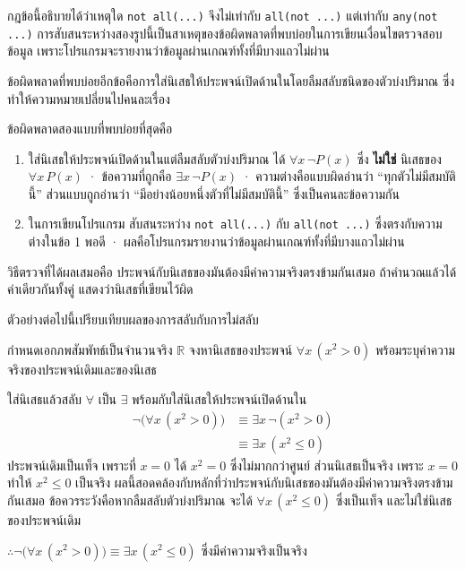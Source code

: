 กฎข้อนี้อธิบายได้ว่าเหตุใด \texttt{not all(...)} จึงไม่เท่ากับ \texttt{all(not ...)} แต่เท่ากับ \texttt{any(not ...)} การสับสนระหว่างสองรูปนี้เป็นสาเหตุของข้อผิดพลาดที่พบบ่อยในการเขียนเงื่อนไขตรวจสอบข้อมูล เพราะโปรแกรมจะรายงานว่าข้อมูลผ่านเกณฑ์ทั้งที่มีบางแถวไม่ผ่าน

ข้อผิดพลาดที่พบบ่อยอีกข้อคือการใส่นิเสธให้ประพจน์เปิดด้านในโดยลืมสลับชนิดของตัวบ่งปริมาณ ซึ่งทำให้ความหมายเปลี่ยนไปคนละเรื่อง

\begin{warning}
ข้อผิดพลาดสองแบบที่พบบ่อยที่สุดคือ

\begin{enumerate}
    \item ใส่นิเสธให้ประพจน์เปิดด้านในแต่ลืมสลับตัวบ่งปริมาณ ได้ $\forall x\, \neg P(x)$ ซึ่ง \textbf{ไม่ใช่} นิเสธของ $\forall x\, P(x)$ · ข้อความที่ถูกคือ $\exists x\, \neg P(x)$ · ความต่างคือแบบผิดอ่านว่า ``ทุกตัวไม่มีสมบัตินี้'' ส่วนแบบถูกอ่านว่า ``มีอย่างน้อยหนึ่งตัวที่ไม่มีสมบัตินี้'' ซึ่งเป็นคนละข้อความกัน
    \item ในการเขียนโปรแกรม สับสนระหว่าง \texttt{not all(...)} กับ \texttt{all(not ...)} ซึ่งตรงกับความต่างในข้อ 1 พอดี · ผลคือโปรแกรมรายงานว่าข้อมูลผ่านเกณฑ์ทั้งที่มีบางแถวไม่ผ่าน
\end{enumerate}

วิธีตรวจที่ได้ผลเสมอคือ ประพจน์กับนิเสธของมันต้องมีค่าความจริงตรงข้ามกันเสมอ ถ้าคำนวณแล้วได้ค่าเดียวกันทั้งคู่ แสดงว่านิเสธที่เขียนไว้ผิด
\end{warning} ตัวอย่างต่อไปนี้เปรียบเทียบผลของการสลับกับการไม่สลับ

\begin{ex}
\label{ex:negate-quantifier}
กำหนดเอกภพสัมพัทธ์เป็นจำนวนจริง $\mathbb{R}$ จงหานิเสธของประพจน์ $\forall x\, (x^2 > 0)$ พร้อมระบุค่าความจริงของประพจน์เดิมและของนิเสธ
\end{ex}

\begin{solution}
ใส่นิเสธแล้วสลับ $\forall$ เป็น $\exists$ พร้อมกับใส่นิเสธให้ประพจน์เปิดด้านใน
\begin{align*}
\neg\big(\forall x\, (x^2 > 0)\big) &\equiv \exists x\, \neg(x^2 > 0)\\
&\equiv \exists x\, (x^2 \leq 0)
\end{align*}
ประพจน์เดิมเป็นเท็จ เพราะที่ $x = 0$ ได้ $x^2 = 0$ ซึ่งไม่มากกว่าศูนย์ ส่วนนิเสธเป็นจริง เพราะ $x = 0$ ทำให้ $x^2 \leq 0$ เป็นจริง ผลนี้สอดคล้องกับหลักที่ว่าประพจน์กับนิเสธของมันต้องมีค่าความจริงตรงข้ามกันเสมอ ข้อควรระวังคือหากลืมสลับตัวบ่งปริมาณ จะได้ $\forall x\, (x^2 \leq 0)$ ซึ่งเป็นเท็จ และไม่ใช่นิเสธของประพจน์เดิม

$\therefore \neg\big(\forall x\, (x^2 > 0)\big) \equiv \exists x\, (x^2 \leq 0)$ ซึ่งมีค่าความจริงเป็นจริง \solhere
\end{solution}


